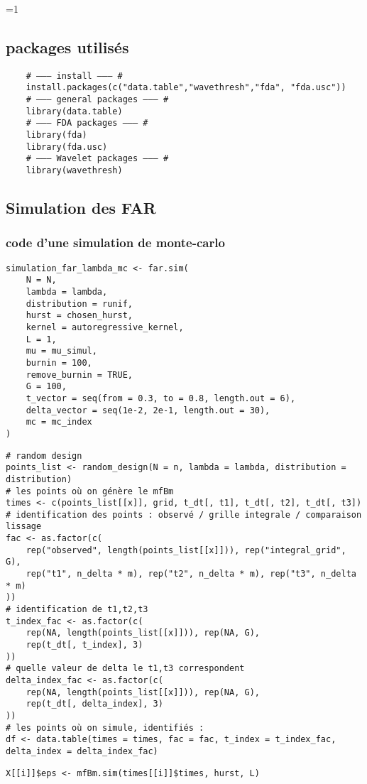 \ifnum\value{code}=1
	\subsection{packages utilisés}
	\begin{verbatim}
    # ——— install ——— #
    install.packages(c("data.table","wavethresh","fda", "fda.usc"))
    # ——— general packages ——— #
    library(data.table)
    # ——— FDA packages ——— #
    library(fda)
    library(fda.usc)
    # ——— Wavelet packages ——— #
    library(wavethresh)
\end{verbatim}

\subsection{Simulation des FAR}

\subsubsection{code d'une simulation de monte-carlo}

\begin{verbatim}
simulation_far_lambda_mc <- far.sim(
    N = N,
    lambda = lambda,
    distribution = runif, 
    hurst = chosen_hurst, 
    kernel = autoregressive_kernel,
    L = 1,
    mu = mu_simul,
    burnin = 100,
    remove_burnin = TRUE,
    G = 100,
    t_vector = seq(from = 0.3, to = 0.8, length.out = 6),
    delta_vector = seq(1e-2, 2e-1, length.out = 30),
    mc = mc_index
)
\end{verbatim}


\begin{verbatim}
# random design
points_list <- random_design(N = n, lambda = lambda, distribution = distribution)
# les points où on génère le mfBm
times <- c(points_list[[x]], grid, t_dt[, t1], t_dt[, t2], t_dt[, t3])
# identification des points : observé / grille integrale / comparaison lissage
fac <- as.factor(c(
    rep("observed", length(points_list[[x]])), rep("integral_grid", G),
    rep("t1", n_delta * m), rep("t2", n_delta * m), rep("t3", n_delta * m)
))
# identification de t1,t2,t3
t_index_fac <- as.factor(c(
    rep(NA, length(points_list[[x]])), rep(NA, G),
    rep(t_dt[, t_index], 3)
))
# quelle valeur de delta le t1,t3 correspondent
delta_index_fac <- as.factor(c(
    rep(NA, length(points_list[[x]])), rep(NA, G),
    rep(t_dt[, delta_index], 3)
))
# les points où on simule, identifiés :
df <- data.table(times = times, fac = fac, t_index = t_index_fac, delta_index = delta_index_fac)
\end{verbatim}
\begin{verbatim}
X[[i]]$eps <- mfBm.sim(times[[i]]$times, hurst, L)
\end{verbatim}

